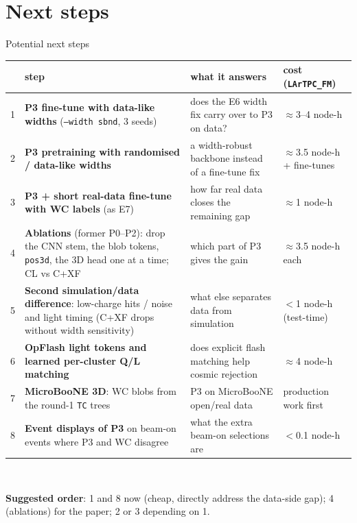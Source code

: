 \documentclass[aspectratio=169,10pt]{beamer}
\newcommand{\code}[1]{\texttt{#1}}
\begin{document}
\section{Next steps}
\begin{frame}{Potential next steps}
  \tiny
  \centering
  \renewcommand{\arraystretch}{1.15}
  \begin{tabular}{c>{\raggedright\arraybackslash}p{5.9cm}>{\raggedright\arraybackslash}p{4.5cm}>{\raggedright\arraybackslash}p{2.3cm}}
    \toprule
    & step & what it answers & cost (\code{LArTPC\_FM}) \\
    \midrule
    1 & \textbf{P3 fine-tune with data-like widths} (\code{--width sbnd}, 3 seeds) & does the E6 width fix carry over to P3 on data? & $\approx$3--4 node-h \\
    2 & \textbf{P3 pretraining with randomised / data-like widths} & a width-robust backbone instead of a fine-tune fix & $\approx$3.5 node-h + fine-tunes \\
    3 & \textbf{P3 + short real-data fine-tune with WC labels} (as E7) & how far real data closes the remaining gap & $\approx$1 node-h \\
    4 & \textbf{Ablations} (former P0--P2): drop the CNN stem, the blob tokens, \code{pos3d}, the 3D head one at a time; CL vs C+XF & which part of P3 gives the gain & $\approx$3.5 node-h each \\
    5 & \textbf{Second simulation/data difference}: low-charge hits / noise and light timing (C+XF drops without width sensitivity) & what else separates data from simulation & $<$1 node-h (test-time) \\
    6 & \textbf{OpFlash light tokens and learned per-cluster Q/L matching} & does explicit flash matching help cosmic rejection & $\approx$4 node-h \\
    7 & \textbf{MicroBooNE 3D}: WC blobs from the round-1 \code{TC} trees & P3 on MicroBooNE open/real data & production work first \\
    8 & \textbf{Event displays of P3} on beam-on events where P3 and WC disagree & what the extra beam-on selections are & $<$0.1 node-h \\
    \bottomrule
  \end{tabular}\\[6pt]
  \raggedright\footnotesize
  \textbf{Suggested order}: 1 and 8 now (cheap, directly address the data-side gap); 4 (ablations) for the paper; 2 or 3 depending on 1.
\end{frame}
\end{document}
